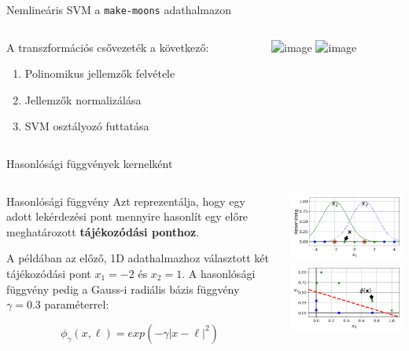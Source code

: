 \documentclass[english, aspectratio=169]{beamer}
\begin{document}
\begin{frame}{Nemlineáris SVM a \texttt{make-moons} adathalmazon}
\begin{columns}
\begin{column}{.5\textwidth}
A transzformációs csővezeték a következő:
\begin{enumerate}
	\item Polinomikus jellemzők felvétele
	\item Jellemzők normalizálása
	\item SVM osztályozó futtatása
\end{enumerate}
\end{column}
\begin{column}{.5\textwidth}
\begin{center}
\includegraphics<1>[width=7cm, height=7cm, keepaspectratio]{images/svm_11.png}
\includegraphics<2>[width=7cm, height=7cm, keepaspectratio]{images/svm_28.png}
\end{center}
\end{column}
\end{columns}
\end{frame}

\begin{frame}{Hasonlósági függvények kernelként}
\begin{columns}
\begin{column}{.5\textwidth}
\begin{block}{Hasonlósági függvény}
Azt reprezentálja, hogy egy adott lekérdezési pont mennyire hasonlít egy előre meghatározott \textbf{tájékozódási ponthoz}.
\end{block}
A példában az előző, 1D adathalmazhoz választott két tájékozódási pont $x_1=-2$ és $x_2=1$. A hasonlósági függvény pedig a Gauss-i radiális bázis függvény $\gamma=0.3$ paraméterrel:
\begin{block}{}
\[
\phi_\gamma \left( x, \ell \right) = exp\left( -\gamma \left| x - \ell \right|^2 \right)
\]
\end{block}
\end{column}
\begin{column}{.5\textwidth}
\begin{center}
\includegraphics[width=6cm, keepaspectratio]{images/svm_14.png}
\includegraphics[width=6cm, keepaspectratio]{images/svm_15.png}
\end{center}
\end{column}
\end{columns}
\end{frame}
\end{document}
